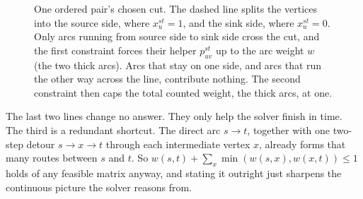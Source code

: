 \begin{figure}[ht]
\centering
{}
\caption{One ordered pair's chosen cut. The dashed line splits the vertices into the source side, where $x^{st}_u = 1$, and the sink side, where $x^{st}_u = 0$. Only arcs running from source side to sink side cross the cut, and the first constraint forces their helper $p^{st}_{uv}$ up to the arc weight $w$ (the two thick arcs). Arcs that stay on one side, and arcs that run the other way across the line, contribute nothing. The second constraint then caps the total counted weight, the thick arcs, at one.}
\label{fig:cut}
\end{figure}

The last two lines change no answer. They only help the solver finish in time. The third is a redundant shortcut. The direct arc $s \to t$, together with one two-step detour $s \to x \to t$ through each intermediate vertex $x$, already forms that many routes between $s$ and $t$. So $w(s,t) + \sum_x \min(w(s,x), w(x,t)) \le 1$ holds of any feasible matrix anyway, and stating it outright just sharpens the continuous picture the solver reasons from.

